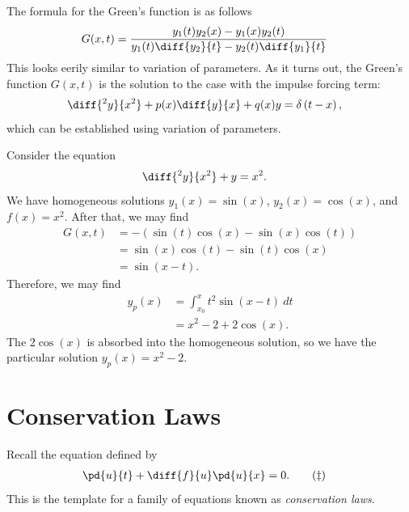 \documentclass[10pt]{mypackage}
\begin{document}
The formula for the Green's function is as follows
\begin{align*}
  G(x,t) &= \frac{y_1(t)y_2(x) - y_1(x)y_2(t)}{y_1(t)\diff{y_2}{t} - y_2(t)\diff{y_1}{t}}
\end{align*}
This looks eerily similar to variation of parameters. As it turns out, the Green's function $G(x,t)$ is the solution to the case with the impulse forcing term:
\begin{align*}
  \diff{^2y}{x^2} + p(x)\diff{y}{x} + q(x)y &= \delta\left( t-x \right),
\end{align*}
which can be established using variation of parameters.
\begin{example}
  Consider the equation
  \begin{align*}
    \diff{^2y}{x^2} + y &= x^2.
  \end{align*}
  We have homogeneous solutions $y_1(x)= \sin(x)$, $y_2(x) = \cos(x)$, and $f(x) = x^2$. After that, we may find
  \begin{align*}
    G(x,t) &= -\left( \sin(t)\cos(x) - \sin(x)\cos(t) \right)\\
           &= \sin(x)\cos(t) - \sin(t)\cos(x)\\
           &= \sin\left( x-t \right).
  \end{align*}
  Therefore, we may find
  \begin{align*}
    y_p(x) &= \int_{x_0}^{x} t^2\sin\left( x-t \right)\:dt\\
           &= x^2 - 2 + 2\cos(x).
  \end{align*}
  The $2\cos(x)$ is absorbed into the homogeneous solution, so we have the particular solution $y_p(x) = x^2 - 2$.
\end{example}
\section{Conservation Laws}%
Recall the equation defined by
\begin{align*}
  \pd{u}{t} + \diff{f}{u}\pd{u}{x} &= 0.\label{eq:conservation_law_template}\tag{$\ddag$}
\end{align*}
This is the template for a family of equations known as \textit{conservation laws}.
\end{document}
